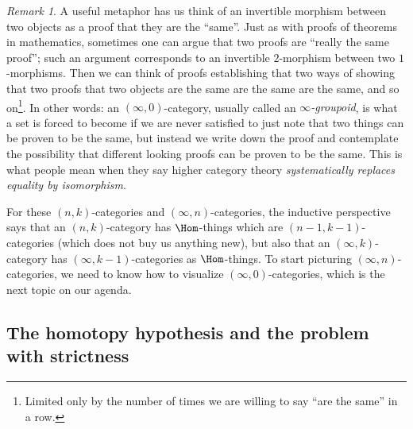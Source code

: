 \documentclass{conm-p-l}
\theoremstyle{definition} \newtheorem{definition}[theorem]{Definition}
\theoremstyle{remark} \newtheorem{remark}[theorem]{Remark}
\numberwithin{equation}{section}
\newcommand{\oo}{\infty}
\begin{document}
\begin{remark}\label{metaphor} A useful metaphor has us think of an
  invertible morphism between two objects as a proof that they are the
  ``same''. Just as with proofs of theorems in mathematics, sometimes
  one can argue that two proofs are ``really the same proof''; such an
  argument corresponds to an invertible $2$-morphism between two
  $1$-morphisms. Then we can think of proofs establishing that two
  ways of showing that two proofs that two objects are the same are
  the same are the same, and so on\footnote{Limited only by the number
    of times we are willing to say ``are the same'' in a row.}. In
  other words: an $(\oo,0)$-category, usually called an
  \emph{$\oo$-groupoid}, is what a set is forced to become if we are
  never satisfied to just note that two things can be proven to be the
  same, but instead we write down the proof and contemplate the
  possibility that different looking proofs can be proven to be the
  same. This is what people mean when they say higher category theory
  \emph{systematically replaces equality by isomorphism}.
\end{remark}

For these $(n,k)$-categories and $(\oo,n)$-categories, the inductive
perspective says that an $(n,k)$-category has $\Hom$-things which are
$(n-1,k-1)$-categories (which does not buy us anything new), but also
that an $(\oo,k)$-category has $(\oo,k-1)$-categories as
$\Hom$-things. To start picturing $(\oo,n)$-categories, we need to
know how to visualize $(\oo,0)$-categories, which is the next topic
on our agenda.

\subsection{The homotopy hypothesis and the problem with strictness}
\label{strict}
\end{document}
